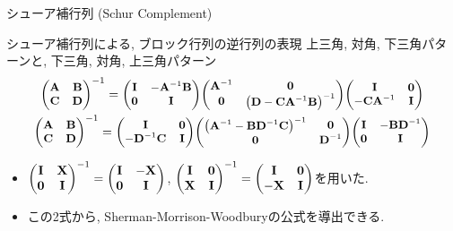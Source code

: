 \documentclass[dvipdfmx,notheorems,t]{beamer}
\begin{document}
\begin{frame}{シューア補行列 (Schur Complement)}
\begin{block}{シューア補行列による, ブロック行列の逆行列の表現}
  上三角, 対角, 下三角パターンと, 下三角, 対角, 上三角パターン
  \begin{gather*}
    \small
    \mqty(\vb{A} & \vb{B} \\ \vb{C} & \vb{D})^{-1}
      = \mqty(\vb{I} & -\vb{A}^{-1} \vb{B} \\ \vb{0} & \vb{I})
        \mqty(\dmat[\vb{0}]{\vb{A}^{-1}, \left( \vb{D} - \vb{C} \vb{A}^{-1} \vb{B} \right)^{-1}})
        \mqty(\vb{I} & \vb{0} \\ -\vb{C} \vb{A}^{-1} & \vb{I}) \\
    \small
    \mqty(\vb{A} & \vb{B} \\ \vb{C} & \vb{D})^{-1}
      = \mqty(\vb{I} & \vb{0} \\ -\vb{D}^{-1} \vb{C} & \vb{I})
        \mqty(\dmat[\vb{0}]{\left( \vb{A}^{-1} - \vb{B} \vb{D}^{-1} \vb{C} \right)^{-1}, \vb{D}^{-1}})
        \mqty(\vb{I} & -\vb{B} \vb{D}^{-1} \\ \vb{0} & \vb{I})
  \end{gather*}
\end{block}

\begin{itemize}
  \item $\mqty(\vb{I} & \vb{X} \\ \vb{0} & \vb{I})^{-1} = \mqty(\vb{I} & -\vb{X} \\ \vb{0} & \vb{I})$,
  $\mqty(\vb{I} & \vb{0} \\ \vb{X} & \vb{I})^{-1} = \mqty(\vb{I} & \vb{0} \\ -\vb{X} & \vb{I})$を用いた.
  \item この2式から, Sherman-Morrison-Woodburyの公式を導出できる.
\end{itemize}
\end{frame}
\end{document}
